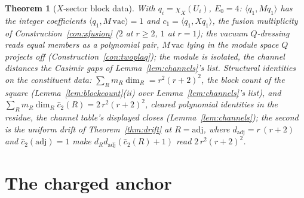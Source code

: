 \documentclass[11pt]{article}
\newtheorem{theorem}{Theorem}
\theoremstyle{definition}
\begin{document}
\begin{theorem}[$X$-sector block data]\label{thm:xdata}
With $q_i=\chi_X(U_i)$, $E_0=4$:
$\langle q_1,Mq_1\rangle$ has the integer coefficients
$\langle q_1,M\,\mathrm{vac}\rangle=1$ and
$c_1=\langle q_1,Xq_1\rangle$, the fusion multiplicity of
Construction~\ref{con:xfusion} ($2$ at $r\ge2$, $1$ at $r=1$); the vacuum $Q$-dressing reads equal
members as a polynomial pair, $M\,\mathrm{vac}$ lying in the module space $Q$ projects off
(Construction~\ref{con:twoplaq}); the module is isolated, the channel
distances the Casimir gaps of Lemma~\ref{lem:channels}'s list.
Structural identities on the constituent data:
$\sum_R m_R\dim_R=r^2(r+2)^2$, the block count of the square
(Lemma~\ref{lem:blockcount}(ii) over Lemma~\ref{lem:channels}'s list),
and $\sum_R m_R\dim_R\hat c_2(R)=2\,r^2(r+2)^2$, cleared polynomial
identities in the residue, the
channel table's displayed closes (Lemma~\ref{lem:channels}); the second is
the uniform drift of Theorem~\ref{thm:drift} at $R=\mathrm{adj}$, where
$d_{\mathrm{adj}}=r\,(r+2)$ and $\hat c_2(\mathrm{adj})=1$ make
$d_Rd_{\mathrm{adj}}(\hat c_2(R)+1)$ read $2\,r^2(r+2)^2$.
\end{theorem}

\section{The charged anchor}
\end{document}

